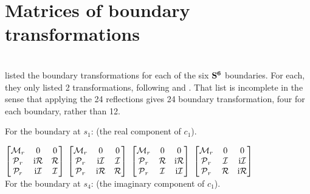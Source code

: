 \documentclass[]{iucr}              %
\numberwithin{equation}{section}
\newcommand{\SVI}[0]{$\bf{S^{6}}$}
\newcommand{\Imaginary}[0]{\mathcal{I}}
\newcommand{\Real}[0]{\mathcal{R}}
\begin{document}
	\section{Matrices of boundary transformations}
	~~\\
	
	
	
	 listed the boundary transformations
	for each of the six \SVI{} boundaries. For each,
	they only listed 2 transformations, following 
	and . That list is incomplete in the sense
	that applying the 24 reflections gives 24 boundary transformation,
	four for each boundary, rather than 12.
		
	
	For the boundary at $s_1$: (the real component of $c_1$).
	
	$\begin{bmatrix}
		\Minus{}_r		& 0					& 0 \\
		\Plus{}_r		&  \textrm{i}\Real{}	& \Real{} \\
		\mathcal{P}_r	& \textrm{i}\Imaginary{}	& \Imaginary{}
	\end{bmatrix}$
	$\begin{bmatrix}
		\Minus{}_r	& 0 				& 0 \\
		\Plus{}_r	&\textrm{i}\Imaginary{}	& \Imaginary{} \\
		\Plus{}_r	& \textrm{i}\Real{}	& \Real{} \\
	\end{bmatrix}$ 
	$\begin{bmatrix}
		\label{thirdmatrix}
		\Minus{}_r	& 0			& 0 \\
		\Plus{}_r	&  \Real{}	& \textrm{i}\Real{} \\
		\Plus{}_r	& \Imaginary{}		&\textrm{i}\Imaginary{}
	\end{bmatrix}	$
	$\begin{bmatrix}
		\Minus{}_r	& 0			& 0 \\
		\Plus{}_r	& \Imaginary{}		&\textrm{i}\Imaginary{} \\
		\Plus{}_r	&  \Real{}	&\textrm{i}\Real{} \\
	\end{bmatrix}$ \\
	
	For the boundary at $s_4$: (the imaginary component of $c_1$).
	
\end{document}
